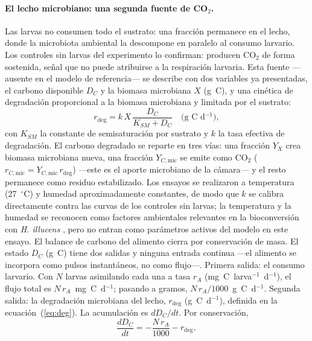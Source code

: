\paragraph{El lecho microbiano: una segunda fuente de CO$_2$.}
Las larvas no consumen todo el sustrato: una fracci\'on permanece en el lecho, donde la microbiota ambiental la descompone en paralelo al consumo larvario. Los controles sin larvas del experimento lo confirman: producen CO$_2$ de forma sostenida, se\~nal que no puede atribuirse a la respiraci\'on larvaria. Esta fuente ---ausente en el modelo de referencia--- se describe con dos variables ya presentadas, el carbono disponible $D_C$ y la biomasa microbiana $X$ (g~C), y una cin\'etica de degradaci\'on proporcional a la biomasa microbiana y limitada por el sustrato:
\begin{equation}
  r_{\mathrm{deg}} = k\,X\,\frac{D_C}{K_{SM} + D_C}
  \quad \text{(g~C~d$^{-1}$)},
  \label{eq:deg}
\end{equation}
con $K_{SM}$ la constante de semisaturaci\'on por sustrato y $k$ la tasa efectiva de degradaci\'on. El carbono degradado se reparte en tres v\'ias: una fracci\'on $Y_X$ crea biomasa microbiana nueva, una fracci\'on $Y_{C,\mathrm{mic}}$ se emite como CO$_2$ ($r_{C,\mathrm{mic}} = Y_{C,\mathrm{mic}}\,r_{\mathrm{deg}}$) ---este es el aporte microbiano de la c\'amara--- y el resto permanece como residuo estabilizado. Los ensayos se realizaron a temperatura (27~$^\circ$C) y humedad aproximadamente constantes, de modo que $k$ se calibra directamente contra las curvas de los controles sin larvas; la temperatura y la humedad se reconocen como factores ambientales relevantes en la bioconversi\'on con \textit{H. illucens} \parencite{bekkerImpactSubstrateMoisture2021a}, pero no entran como par\'ametros activos del modelo en este ensayo. El balance de carbono del alimento cierra por conservaci\'on de masa. El estado $D_C$ (g~C) tiene dos salidas y ninguna entrada continua ---el alimento se incorpora como pulsos instant\'aneos, no como flujo---. Primera salida: el consumo larvario. Con $N$ larvas asimilando cada una a tasa $r_A$ (mg~C~larva$^{-1}$~d$^{-1}$), el flujo total es $N\,r_A$~mg~C~d$^{-1}$; pasando a gramos, $N\,r_A/1000$~g~C~d$^{-1}$. Segunda salida: la degradaci\'on microbiana del lecho, $r_{\mathrm{deg}}$ (g~C~d$^{-1}$), definida en la ecuaci\'on~(\ref{eq:deg}). La acumulaci\'on es $dD_C/dt$. Por conservaci\'on,
\begin{equation}
  \frac{dD_C}{dt} = -\frac{N\,r_A}{1000} - r_{\mathrm{deg}},
  \label{eq:balanceDC}
\end{equation}
